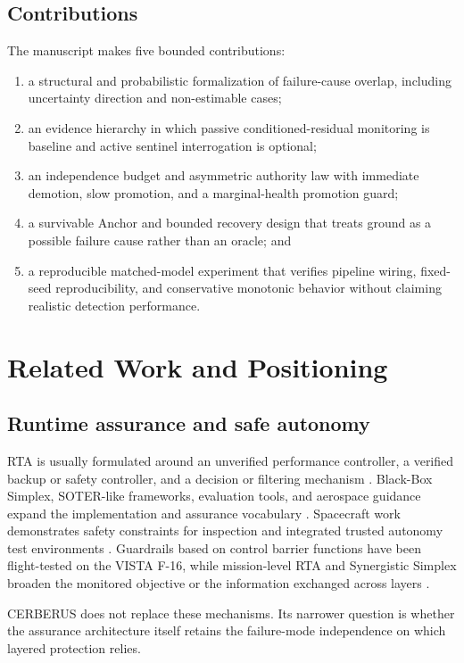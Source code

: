 \subsection{Contributions}
The manuscript makes five bounded contributions:
\begin{enumerate}[leftmargin=1.5em]
  \item a structural and probabilistic formalization of failure-cause overlap, including uncertainty direction and non-estimable cases;
  \item an evidence hierarchy in which passive conditioned-residual monitoring is baseline and active sentinel interrogation is optional;
  \item an independence budget and asymmetric authority law with immediate demotion, slow promotion, and a marginal-health promotion guard;
  \item a survivable Anchor and bounded recovery design that treats ground as a possible failure cause rather than an oracle; and
  \item a reproducible matched-model experiment that verifies pipeline wiring, fixed-seed reproducibility, and conservative monotonic behavior without claiming realistic detection performance.
\end{enumerate}

\section{Related Work and Positioning}
\subsection{Runtime assurance and safe autonomy}
RTA is usually formulated around an unverified performance controller, a verified backup or safety controller, and a decision or filtering mechanism \cite{Seto1998,Sha2001,HobbsTutorial2021}. Black-Box Simplex, SOTER-like frameworks, evaluation tools, and aerospace guidance expand the implementation and assurance vocabulary \cite{Mehmood2022,RTAEval2023,BratPai2023}. Spacecraft work demonstrates safety constraints for inspection and integrated trusted autonomy test environments \cite{Dunlap2023,Hobbs2025}. Guardrails based on control barrier functions have been flight-tested on the VISTA F-16, while mission-level RTA and Synergistic Simplex broaden the monitored objective or the information exchanged across layers \cite{Guardrails2026,MissionLevelRTA2026,SynergisticSimplex2026}.

CERBERUS does not replace these mechanisms. Its narrower question is whether the assurance architecture itself retains the failure-mode independence on which layered protection relies.

